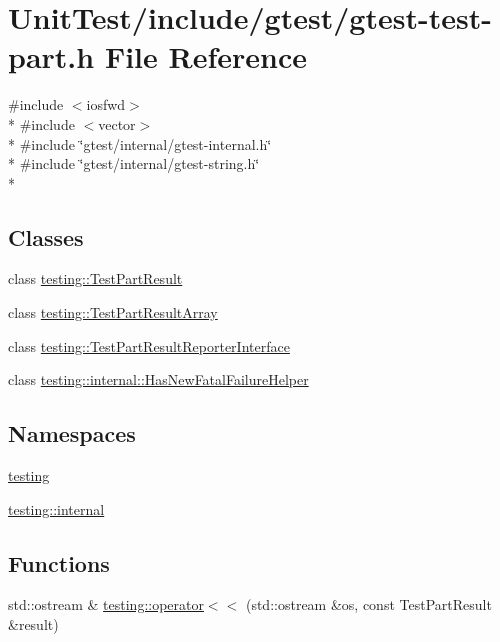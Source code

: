 \hypertarget{gtest-test-part_8h}{\section{Unit\+Test/include/gtest/gtest-\/test-\/part.h File Reference}
\label{gtest-test-part_8h}
}
{\ttfamily \#include $<$iosfwd$>$}\\*
{\ttfamily \#include $<$vector$>$}\\*
{\ttfamily \#include \char`\"{}gtest/internal/gtest-\/internal.\+h\char`\"{}}\\*
{\ttfamily \#include \char`\"{}gtest/internal/gtest-\/string.\+h\char`\"{}}\\*
\subsection*{Classes}
\begin{DoxyCompactItemize}
\item 
class \hyperlink{classtesting_1_1_test_part_result}{testing\+::\+Test\+Part\+Result}
\item 
class \hyperlink{classtesting_1_1_test_part_result_array}{testing\+::\+Test\+Part\+Result\+Array}
\item 
class \hyperlink{classtesting_1_1_test_part_result_reporter_interface}{testing\+::\+Test\+Part\+Result\+Reporter\+Interface}
\item 
class \hyperlink{classtesting_1_1internal_1_1_has_new_fatal_failure_helper}{testing\+::internal\+::\+Has\+New\+Fatal\+Failure\+Helper}
\end{DoxyCompactItemize}
\subsection*{Namespaces}
\begin{DoxyCompactItemize}
\item 
 \hyperlink{namespacetesting}{testing}
\item 
 \hyperlink{namespacetesting_1_1internal}{testing\+::internal}
\end{DoxyCompactItemize}
\subsection*{Functions}
\begin{DoxyCompactItemize}
\item 
std\+::ostream \& \hyperlink{namespacetesting_a266e39b7c4691fedb856047673a412d8}{testing\+::operator$<$$<$} (std\+::ostream \&os, const Test\+Part\+Result \&result)
\end{DoxyCompactItemize}
